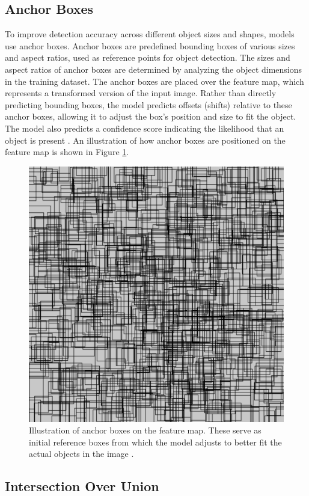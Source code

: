 \newpage

\subsection{Anchor Boxes}

To improve detection accuracy across different object sizes and shapes, models use anchor boxes. Anchor boxes are predefined bounding boxes of various sizes and aspect ratios, used as reference points for object detection. The sizes and aspect ratios of anchor boxes are determined by analyzing the object dimensions in the training dataset. The anchor boxes are placed over the feature map, which represents a transformed version of the input image. Rather than directly predicting bounding boxes, the model predicts offsets (shifts) relative to these anchor boxes, allowing it to adjust the box's position and size to fit the object. The model also predicts a confidence score indicating the likelihood that an object is present \cite{thinkautonomous:anchorboxes}. An illustration of how anchor boxes are positioned on the feature map is shown in Figure \ref{fig:anchor-box}.

\begin{figure}[h!]
    \centering
    \includegraphics[width=0.56\linewidth]{figures/theory/image-recognition/anchor-boxes.png}
    \caption[Anchor boxes in object detection]{Illustration of anchor boxes on the feature map. These serve as initial reference boxes from which the model adjusts to better fit the actual objects in the image \cite{thinkautonomous:anchorboxes}.}
    \label{fig:anchor-box}
\end{figure}

\newpage

\subsection{Intersection Over Union}

